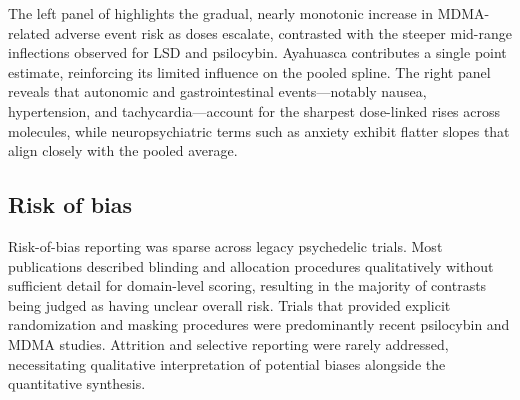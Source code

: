 
The left panel of  highlights the gradual, nearly monotonic increase in MDMA-related adverse event risk as doses escalate, contrasted with the steeper mid-range inflections observed for LSD and psilocybin. Ayahuasca contributes a single point estimate, reinforcing its limited influence on the pooled spline. The right panel reveals that autonomic and gastrointestinal events---notably nausea, hypertension, and tachycardia---account for the sharpest dose-linked rises across molecules, while neuropsychiatric terms such as anxiety exhibit flatter slopes that align closely with the pooled average.

\subsection{Risk of bias}
Risk-of-bias reporting was sparse across legacy psychedelic trials. Most publications described blinding and allocation procedures qualitatively without sufficient detail for domain-level scoring, resulting in the majority of contrasts being judged as having unclear overall risk. Trials that provided explicit randomization and masking procedures were predominantly recent psilocybin and MDMA studies. Attrition and selective reporting were rarely addressed, necessitating qualitative interpretation of potential biases alongside the quantitative synthesis.

